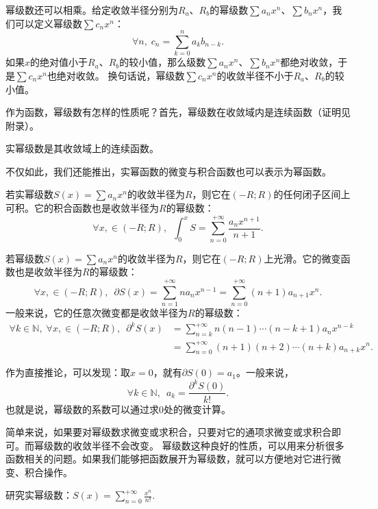\documentclass[12pt,UTF8]{ctexbook}
\begin{document}
幂级数还可以相乘。给定收敛半径分别为$R_a$、$R_b$的幂级数$\sum a_n x^n$、$\sum b_n x^n$，我们可以定义幂级数$\sum c_n x^n$：
$$ \forall n, \; c_n = \sum_{k=0}^n a_k b_{n-k}.$$
如果$x$的绝对值小于$R_a$、$R_b$的较小值，那么级数$\sum a_n x^n$、$\sum b_n x^n$都绝对收敛，于是$\sum c_n x^n$也绝对收敛。
换句话说，幂级数$\sum c_n x^n$的收敛半径不小于$R_a$、$R_b$的较小值。

作为函数，幂级数有怎样的性质呢？首先，幂级数在收敛域内是连续函数（证明见附录）。

\begin{tm}
    实幂级数是其收敛域上的连续函数。
\end{tm}

不仅如此，我们还能推出，实幂函数的微变与积合函数也可以表示为幂函数。

\begin{tm}
    若实幂级数$S(x) = \sum a_n x^n$的收敛半径为$R$，则它在$(-R;R)$的任何闭子区间上可积。它的积合函数也是收敛半径为$R$的幂级数：
    $$ \forall x, \in (-R;R),\,\,\, \int_0^x S =  \sum_{n=0}^{+\infty} \frac{a_n x^{n+1}}{n + 1}. $$
\end{tm}

\begin{tm}
    若幂级数$S(x) = \sum a_n x^n$的收敛半径为$R$，则它在$(-R;R)$上光滑。它的微变函数也是收敛半径为$R$的幂级数：
    $$ \forall x, \in (-R;R),\,\,\, \partial S(x) =  \sum_{n=1}^{+\infty} na_n x^{n-1} = \sum_{n=0}^{+\infty} (n + 1)a_{n+1} x^{n}. $$
    一般来说，它的任意次微变都是收敛半径为$R$的幂级数：
    \begin{align*}
        \forall k \in \mathbb{N},\;\forall x, \in (-R;R),\,\,\, \partial^k S(x) &= \sum_{n=k}^{+\infty} n(n-1)\cdots(n - k + 1)a_n x^{n-k} \\
        &= \sum_{n=0}^{+\infty} (n + 1)(n + 2)\cdots(n + k)a_{n+k} x^{n}. 
    \end{align*}
\end{tm}

作为直接推论，可以发现：取$x=0$，就有$\partial S(0) = a_1$。一般来说，
$$\forall k\in \mathbb{N}, \,\,\, a_k = \frac{\partial^k S(0)}{k!}.$$
也就是说，幂级数的系数可以通过求$0$处的微变计算。

简单来说，如果要对幂级数求微变或求积合，只要对它的通项求微变或求积合即可。而幂级数的收敛半径不会改变。
幂级数这种良好的性质，可以用来分析很多函数相关的问题。如果我们能够把函数展开为幂级数，就可以方便地对它进行微变、积合操作。

\begin{et}
    研究实幂级数：$S(x) = \sum_{n=0}^{+\infty} \frac{x^n}{n!}. $
\end{et}
\end{document}
